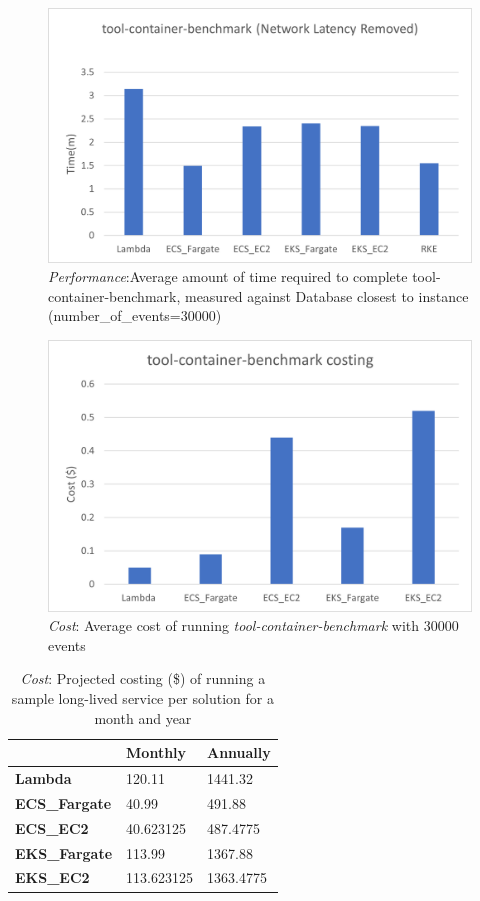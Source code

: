 \begin{figure}[hp]
  \includegraphics{images/perf-tcb_network.png}
  \caption{\emph{Performance}:Average amount of time required to complete tool-container-benchmark, measured against Database closest to instance (number\_of\_events=30000)}
  \label{fig:perf_tcb_network}
\end{figure}

\begin{figure}[hp]
  \includegraphics{images/cost-workload.png}
  \caption{\emph{Cost}: Average cost of running \emph{tool-container-benchmark} with 30000 events}
  \label{fig:cost_workload}
\end{figure}

\begin{table}[hp]
  \caption{\emph{Cost}: Projected costing (\$) of running a sample long-lived service per solution for a month and year}
  \small
  \begin{tabularx}{1\textwidth}{X | X | X }
    \space            & \bf{Monthly} & \bf{Annually} \\
    \hline
    \bf{Lambda      } & 120.11       & 1441.32       \\
    \bf{ECS\_Fargate} & 40.99        & 491.88        \\
    \bf{ECS\_EC2    } & 40.623125    & 487.4775      \\
    \bf{EKS\_Fargate} & 113.99       & 1367.88       \\
    \bf{EKS\_EC2    } & 113.623125   & 1363.4775     \\
  \end{tabularx}
  \label{fig:cost_projected}
\end{table}

